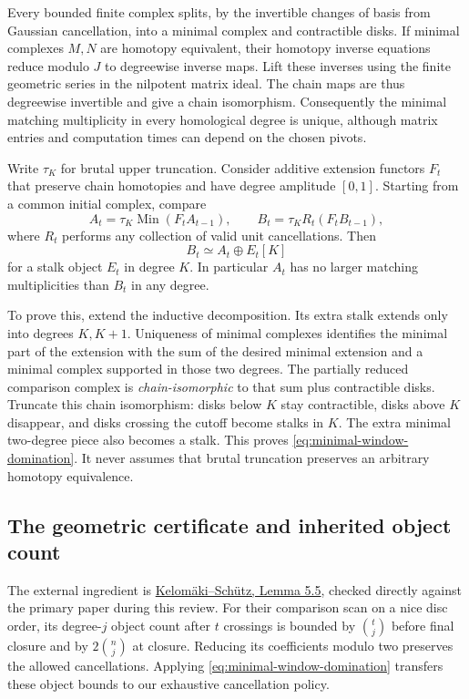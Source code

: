Every bounded finite complex splits, by the invertible changes of basis
from Gaussian cancellation, into a minimal complex and contractible disks.
If minimal complexes $M,N$ are homotopy equivalent, their homotopy inverse
equations reduce modulo $J$ to degreewise inverse maps. Lift these inverses
using the finite geometric series in the nilpotent matrix ideal. The
chain maps are thus degreewise invertible and give a chain isomorphism.
Consequently the minimal matching multiplicity in every homological degree
is unique, although matrix entries and computation times can depend on
the chosen pivots.

Write $\tau_K$ for brutal upper truncation. Consider additive extension
functors $F_t$ that preserve chain homotopies and have degree amplitude
$[0,1]$. Starting from a common initial complex, compare
\[
 A_t=\tau_K\operatorname{Min}(F_t A_{t-1}),\qquad
 B_t=\tau_K R_t(F_t B_{t-1}),
\]
where $R_t$ performs any collection of valid unit cancellations. Then
\begin{equation}\label{eq:minimal-window-domination}
 B_t\simeq A_t\oplus E_t[K]
\end{equation}
for a stalk object $E_t$ in degree $K$. In particular $A_t$ has no larger
matching multiplicities than $B_t$ in any degree.

To prove this, extend the inductive decomposition. Its extra stalk extends
only into degrees $K,K+1$. Uniqueness of minimal complexes identifies the
minimal part of the extension with the sum of the desired minimal extension
and a minimal complex supported in those two degrees. The partially reduced
comparison complex is \emph{chain-isomorphic} to that sum plus contractible
disks. Truncate this chain isomorphism: disks below $K$ stay contractible,
disks above $K$ disappear, and disks crossing the cutoff become stalks in
$K$. The extra minimal two-degree piece also becomes a stalk. This proves
\eqref{eq:minimal-window-domination}. It never assumes that brutal
truncation preserves an arbitrary homotopy equivalence.

\subsection{The geometric certificate and inherited object count}
The external ingredient is
\href{https://arxiv.org/html/2601.02119v1}{Kelom\"aki--Sch\"utz,
Lemma 5.5}, checked directly against the primary paper during this review.
For their comparison scan on a nice disc order, its degree-$j$ object
count after $t$ crossings is bounded by $\binom tj$ before final closure
and by $2\binom nj$ at closure. Reducing its coefficients modulo two
preserves the allowed cancellations. Applying
\eqref{eq:minimal-window-domination} transfers these object bounds to our
exhaustive cancellation policy.

